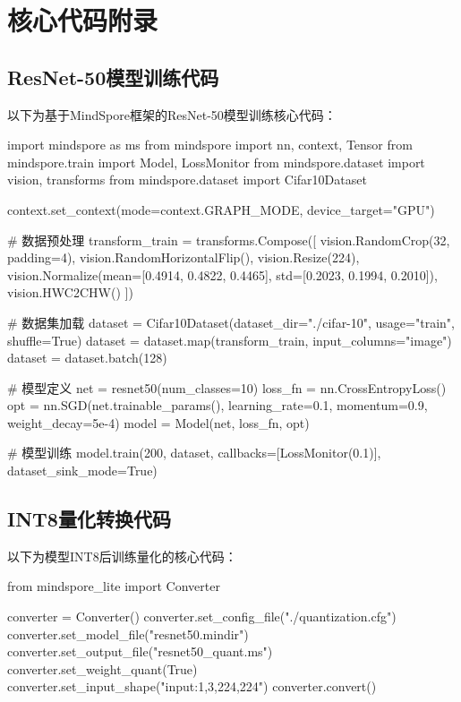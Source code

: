 \chapter{核心代码附录}

\section{ResNet-50模型训练代码}

以下为基于MindSpore框架的ResNet-50模型训练核心代码：

\begin{codeblock}[language=Python, caption={ResNet-50模型训练代码}]
import mindspore as ms
from mindspore import nn, context, Tensor
from mindspore.train import Model, LossMonitor
from mindspore.dataset import vision, transforms
from mindspore.dataset import Cifar10Dataset

context.set_context(mode=context.GRAPH_MODE, device_target="GPU")

# 数据预处理
transform_train = transforms.Compose([
    vision.RandomCrop(32, padding=4),
    vision.RandomHorizontalFlip(),
    vision.Resize(224),
    vision.Normalize(mean=[0.4914, 0.4822, 0.4465],
                     std=[0.2023, 0.1994, 0.2010]),
    vision.HWC2CHW()
])

# 数据集加载
dataset = Cifar10Dataset(dataset_dir="./cifar-10",
    usage="train", shuffle=True)
dataset = dataset.map(transform_train,
    input_columns="image")
dataset = dataset.batch(128)

# 模型定义
net = resnet50(num_classes=10)
loss_fn = nn.CrossEntropyLoss()
opt = nn.SGD(net.trainable_params(),
    learning_rate=0.1, momentum=0.9,
    weight_decay=5e-4)
model = Model(net, loss_fn, opt)

# 模型训练
model.train(200, dataset,
    callbacks=[LossMonitor(0.1)],
    dataset_sink_mode=True)
\end{codeblock}

\section{INT8量化转换代码}

以下为模型INT8后训练量化的核心代码：

\begin{codeblock}[language=Python, caption={INT8量化转换代码}]
from mindspore_lite import Converter

converter = Converter()
converter.set_config_file("./quantization.cfg")
converter.set_model_file("resnet50.mindir")
converter.set_output_file("resnet50_quant.ms")
converter.set_weight_quant(True)
converter.set_input_shape("input:1,3,224,224")
converter.convert()
\end{codeblock}

